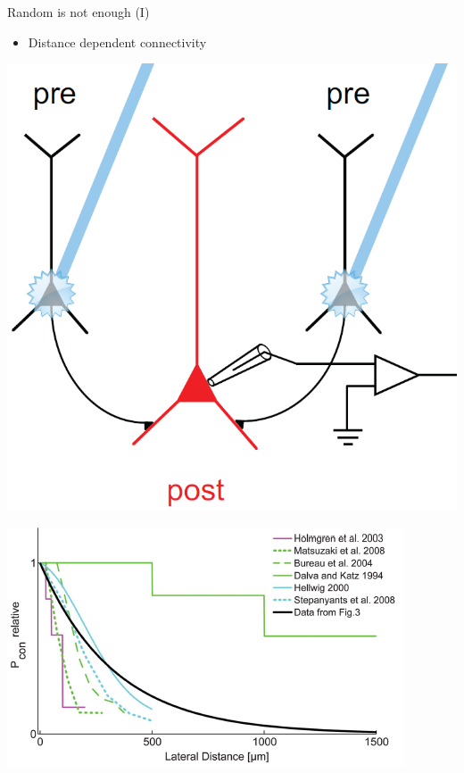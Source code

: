 \documentclass[fleqn]{beamer}
\newcommand{\ppc}[1]{\pause\setcounter{page}{#1}}
\begin{document}
\begin{frame}{Random is not enough (I)}
    \begin{itemize}
      \item Distance dependent connectivity
    \end{itemize}
    \vspace*{.5cm}
    \begin{minipage}{.28\linewidth}
  \begin{center}
	\includegraphics[width=\linewidth]{figures/boucsein0.png}
  \end{center}
    \begin{flushright}
	{\footnotesize \cite{Boucsein2011}}
    \end{flushright}
    \end{minipage}\ppc{5}
        \begin{minipage}{.68\linewidth}
  \begin{center}
	\includegraphics[width=.9\linewidth]{figures/boucsein1.png}
  \end{center}
      \end{minipage}
\end{frame}
\end{document}
